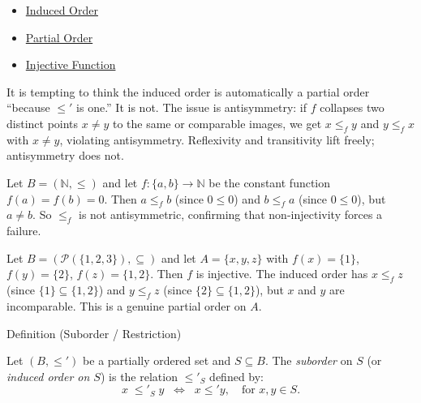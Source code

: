 \begin{dependencies}
\begin{itemize}
  \item \hyperref[def:induced-order]{Induced Order}
  \item \hyperref[def:partial-order]{Partial Order}
  \item \hyperref[def:injective]{Injective Function}
\end{itemize}
\end{dependencies}

\begin{remark*}
It is tempting to think the induced order is automatically a partial order
``because $\leq'$ is one.'' It is not. The issue is antisymmetry: if $f$
collapses two distinct points $x \neq y$ to the same or comparable images,
we get $x \leq_f y$ and $y \leq_f x$ with $x \neq y$, violating
antisymmetry. Reflexivity and transitivity lift freely; antisymmetry does
not.
\end{remark*}

\begin{example*}
Let $B = (\mathbb{N}, \leq)$ and let $f : \{a,b\} \to \mathbb{N}$ be the
constant function $f(a) = f(b) = 0$. Then $a \leq_f b$ (since $0 \leq 0$)
and $b \leq_f a$ (since $0 \leq 0$), but $a \neq b$. So $\leq_f$ is not
antisymmetric, confirming that non-injectivity forces a failure.
\end{example*}

\begin{example*}
Let $B = (\mathcal{P}(\{1,2,3\}), \subseteq)$ and let
$A = \{x, y, z\}$ with $f(x) = \{1\}$, $f(y) = \{2\}$, $f(z) = \{1,2\}$.
Then $f$ is injective. The induced order has $x \leq_f z$ (since
$\{1\} \subseteq \{1,2\}$) and $y \leq_f z$ (since $\{2\} \subseteq \{1,2\}$),
but $x$ and $y$ are incomparable. This is a genuine partial order on $A$.
\end{example*}


\begin{definitionbox}{Definition (Suborder / Restriction)}
\begin{definition}\label{def:suborder}
Let $(B, \leq')$ be a partially ordered set and $S \subseteq B$. The
\emph{suborder} on $S$ (or \emph{induced order on $S$}) is the relation
$\leq'_S$ defined by:
\[
x \;\leq'_S\; y
\;\;\Longleftrightarrow\;\;
x \leq' y,
\quad \text{for } x, y \in S.
\]
\end{definition}
\end{definitionbox}

